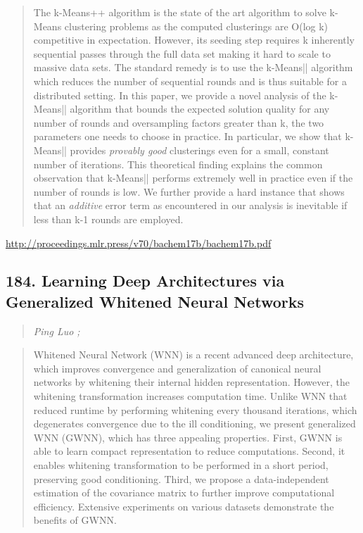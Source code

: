 \documentclass{article}
\begin{document}
\begin{quote}
    The k-Means++ algorithm is the state of the art algorithm to solve k-Means clustering problems as the computed clusterings are O(log k) competitive in expectation. However, its seeding step requires k inherently sequential passes through the full data set making it hard to scale to massive data sets. The standard remedy is to use the k-Means|| algorithm which reduces the number of sequential rounds and is thus suitable for a distributed setting. In this paper, we provide a novel analysis of the k-Means|| algorithm that bounds the expected solution quality for any number of rounds and oversampling factors greater than k, the two parameters one needs to choose in practice. In particular, we show that k-Means|| provides \textit{provably good} clusterings even for a small, constant number of iterations. This theoretical finding explains the common observation that k-Means|| performs extremely well in practice even if the number of rounds is low. We further provide a hard instance that shows that an \textit{additive} error term as encountered in our analysis is inevitable if less than k-1 rounds are employed.  \end{quote}

\href{http://proceedings.mlr.press/v70/bachem17b/bachem17b.pdf}{http://proceedings.mlr.press/v70/bachem17b/bachem17b.pdf}

\subsection{184. Learning Deep Architectures via Generalized Whitened Neural Networks}

\begin{quote}
\footnotesize{\textit{Ping Luo ;}}
\end{quote}

\begin{quote}
    Whitened Neural Network (WNN) is a recent advanced deep architecture, which improves convergence and generalization of canonical neural networks by whitening their internal hidden representation. However, the whitening transformation increases computation time. Unlike WNN that reduced runtime by performing whitening every thousand iterations, which degenerates convergence due to the ill conditioning, we present generalized WNN (GWNN), which has three appealing properties. First, GWNN is able to learn compact representation to reduce computations. Second, it enables whitening transformation to be performed in a short period, preserving good conditioning. Third, we propose a data-independent estimation of the covariance matrix to further improve computational efficiency. Extensive experiments on various datasets demonstrate the benefits of GWNN.  \end{quote}
\end{document}

